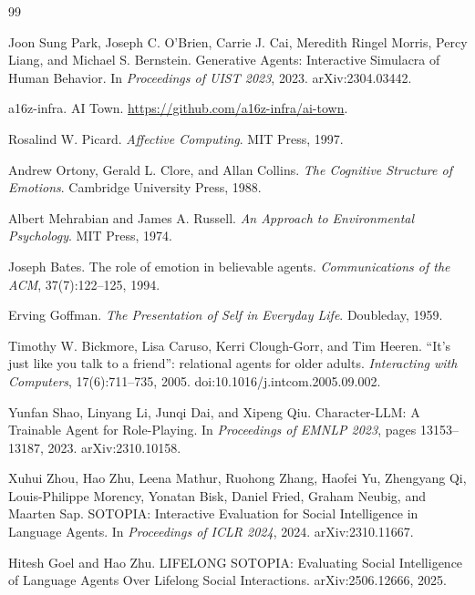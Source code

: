 \documentclass[11pt]{article}
\begin{document}
\begin{thebibliography}{99}

Joon Sung Park, Joseph C. O'Brien, Carrie J. Cai, Meredith Ringel Morris, Percy Liang, and Michael S. Bernstein.
\newblock Generative Agents: Interactive Simulacra of Human Behavior.
\newblock In \emph{Proceedings of UIST 2023}, 2023. arXiv:2304.03442.

a16z-infra.
\newblock AI Town.
\newblock \url{https://github.com/a16z-infra/ai-town}.

Rosalind W. Picard.
\newblock \emph{Affective Computing}.
\newblock MIT Press, 1997.

Andrew Ortony, Gerald L. Clore, and Allan Collins.
\newblock \emph{The Cognitive Structure of Emotions}.
\newblock Cambridge University Press, 1988.

Albert Mehrabian and James A. Russell.
\newblock \emph{An Approach to Environmental Psychology}.
\newblock MIT Press, 1974.

Joseph Bates.
\newblock The role of emotion in believable agents.
\newblock \emph{Communications of the ACM}, 37(7):122--125, 1994.

Erving Goffman.
\newblock \emph{The Presentation of Self in Everyday Life}.
\newblock Doubleday, 1959.

Timothy W. Bickmore, Lisa Caruso, Kerri Clough-Gorr, and Tim Heeren.
\newblock ``It's just like you talk to a friend'': relational agents for older adults.
\newblock \emph{Interacting with Computers}, 17(6):711--735, 2005.
\newblock doi:10.1016/j.intcom.2005.09.002.

Yunfan Shao, Linyang Li, Junqi Dai, and Xipeng Qiu.
\newblock Character-LLM: A Trainable Agent for Role-Playing.
\newblock In \emph{Proceedings of EMNLP 2023}, pages 13153--13187, 2023.
\newblock arXiv:2310.10158.

Xuhui Zhou, Hao Zhu, Leena Mathur, Ruohong Zhang, Haofei Yu, Zhengyang Qi, Louis-Philippe Morency, Yonatan Bisk, Daniel Fried, Graham Neubig, and Maarten Sap.
\newblock SOTOPIA: Interactive Evaluation for Social Intelligence in Language Agents.
\newblock In \emph{Proceedings of ICLR 2024}, 2024.
\newblock arXiv:2310.11667.

Hitesh Goel and Hao Zhu.
\newblock LIFELONG SOTOPIA: Evaluating Social Intelligence of Language Agents Over Lifelong Social Interactions.
\newblock arXiv:2506.12666, 2025.


\end{thebibliography}
\end{document}
